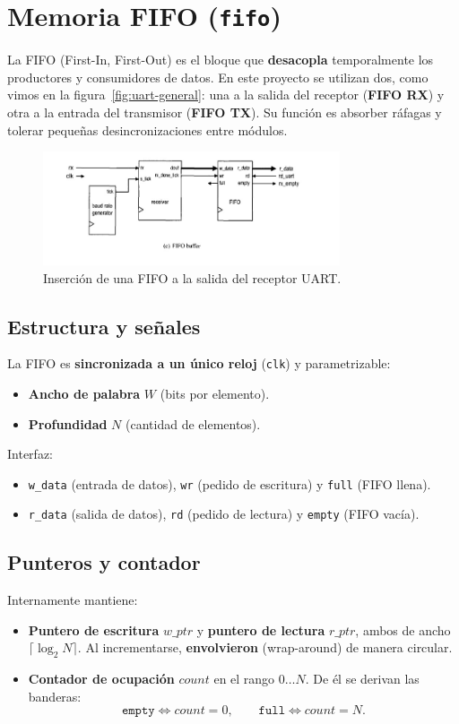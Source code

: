 \section{Memoria FIFO (\texttt{fifo})}

La FIFO (First-In, First-Out) es el bloque que \textbf{desacopla} temporalmente los productores y consumidores de datos. En este proyecto se utilizan dos, como vimos en la figura~\ref{fig:uart-general}: una a la salida del receptor (\textbf{FIFO RX}) y otra a la entrada del transmisor (\textbf{FIFO TX}). Su función es absorber ráfagas y tolerar pequeñas desincronizaciones entre módulos.

\begin{figure}[H]
    \centering
    \includegraphics[width=0.78\textwidth]{img/FIFObuffer.jpeg}
    \caption{Inserción de una FIFO a la salida del receptor UART.}
    \label{fig:fifo-buffer}
\end{figure}

\subsection{Estructura y señales}
La FIFO es \textbf{sincronizada a un único reloj} (\texttt{clk}) y parametrizable:
\begin{itemize}
    \item \textbf{Ancho de palabra} \(W\) (bits por elemento).
    \item \textbf{Profundidad} \(N\) (cantidad de elementos).
\end{itemize}

Interfaz:
\begin{itemize}
    \item \texttt{w\_data} (entrada de datos), \texttt{wr} (pedido de escritura) y \texttt{full} (FIFO llena).
    \item \texttt{r\_data} (salida de datos), \texttt{rd} (pedido de lectura) y \texttt{empty} (FIFO vacía).
\end{itemize}

\subsection{Punteros y contador}
Internamente mantiene:
\begin{itemize}
    \item \textbf{Puntero de escritura} \(w\_ptr\) y \textbf{puntero de lectura} \(r\_ptr\), ambos de ancho \(\lceil \log_2 N \rceil\). Al incrementarse, \textbf{envolvieron} (wrap-around) de manera circular.
    \item \textbf{Contador de ocupación} \(count\) en el rango \(0 \ldots N\). De él se derivan las banderas:
    \[
        \texttt{empty} \Leftrightarrow count=0,\qquad
        \texttt{full}  \Leftrightarrow count=N.
    \]
\end{itemize}

